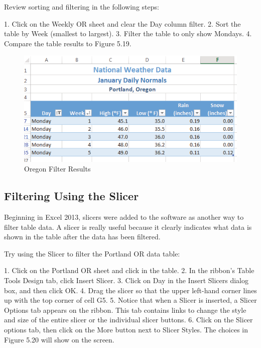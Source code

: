 Review sorting and filtering in the following steps:

1.   Click on the Weekly OR sheet and clear the Day column filter.
2.   Sort the table by Week (smallest to largest).
3.   Filter the table to only show Mondays.
4.   Compare the table results to Figure 5.19.

\begin{figure}[H]
	\centering
	\includegraphics[width=\maxwidth{.95\linewidth}]{gfx/ch05_fig19}
	\caption{Oregon Filter Results}
	\label{05:fig19}
\end{figure}



\subsection{Filtering Using the Slicer}

Beginning in Excel 2013, slicers were added to the software as another way to filter table data. A slicer is really useful because it clearly indicates what data is shown in the table after the data has been filtered.

Try using the Slicer to filter the Portland OR data table:

1. Click on the Portland OR sheet and click in the table.
2. In the ribbon's Table Tools Design tab, click Insert Slicer.
3. Click on Day in the Insert Slicers dialog box, and then click OK.
4. Drag the slicer so that the upper left-hand corner lines up with the top corner of cell G5.
5. Notice that when a Slicer is inserted, a Slicer Options tab appears on the ribbon. This tab contains links to change the style and size of the entire slicer or the individual slicer buttons.
6. Click on the Slicer options tab, then click on the More button next to Slicer Styles. The choices in Figure 5.20 will show on the screen.

